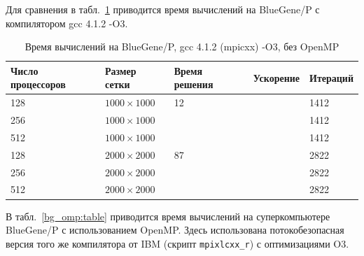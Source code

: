 \documentclass[12pt,notitlepage,oneside]{extarticle}
\begin{document}
Для сравнения в табл.~\ref{bg_gcc:table} приводится время вычислений на BlueGene/P
с компилятором gcc 4.1.2 -O3.

\begin{table}[h]
\centering
\caption{Время вычислений на BlueGene/P, gcc 4.1.2 (mpicxx) -O3, без OpenMP}
\label{bg_gcc:table}
\begin{tabular}{|l|l|l|l|l|}
\textbf{Число процессоров} & \textbf{Размер сетки} & \textbf{Время решения} & \textbf{Ускорение}      & \textbf{Итераций}        \\ \hline
128                        & $1000 \times 1000 $        &  12                   &                    & 1412                     \\
256                        & $1000 \times 1000 $        &                       &                    & 1412                         \\
512                        & $1000 \times 1000 $        &                        &                    & 1412                         \\ \hline
128                        & $2000 \times 2000 $        &  87                    &                    & 2822                     \\
256                        & $2000 \times 2000 $        &                        &                    & 2822                         \\
512                        & $2000 \times 2000 $        &                        &                    & 2822
\end{tabular}
\end{table}

В табл.~\ref{bg_omp:table} приводится время вычислений на суперкомпьютере
BlueGene/P с использованием OpenMP. Здесь использована потокобезопасная версия
того же компилятора от IBM (скрипт \texttt{mpixlcxx\_r}) с оптимизациями O3.
\end{document}
